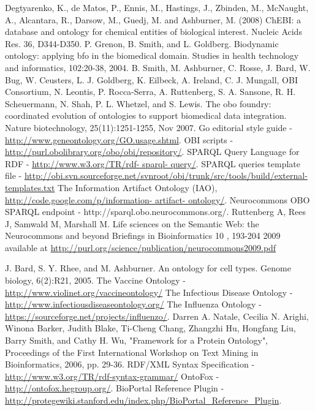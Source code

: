 \documentclass{ao2e}%
\begin{document}
\begin{thebibliography}{}
 Degtyarenko, K., de Matos, P., Ennis, M., Hastings, J., Zbinden, M., McNaught, A., Alcantara, R., Darsow, M., Guedj, M. and Ashburner, M. (2008) ChEBI: a database and ontology for chemical entities of biological interest. Nucleic Acids Res. 36, D344-D350.
 P. Grenon, B. Smith, and L. Goldberg. Biodynamic ontology: applying bfo in the biomedical domain. Studies in health 
technology and informatics, 102:20-38, 2004. 
 B. Smith, M. Ashburner, C. Rosse, J. Bard, W. Bug, W. Ceusters, L. J. Goldberg, K. Eilbeck, A. Ireland, C. J. Mungall, 
OBI Consortium, N. Leontis, P. Rocca-Serra, A. Ruttenberg, S. A. Sansone, R. H. Scheuermann, N. Shah, P. L. Whetzel, and S. Lewis. The obo foundry: coordinated evolution of ontologies to support biomedical data integration. Nature 
biotechnology, 25(11):1251-1255, Nov 2007. 
 Go editorial style guide - \url{http://www.geneontology.org/GO.usage.shtml}.
 OBI scripts -  \url{http://purl.obolibrary.org/obo/obi/repository/}.
 SPARQL Query Language for RDF - \url{http://www.w3.org/TR/rdf- sparql- query/}. 
 SPARQL queries template file - \url{http://obi.svn.sourceforge.net/svnroot/obi/trunk/src/tools/build/external-templates.txt}
 The Information Artifact Ontology (IAO), \url{http://code.google.com/p/information- artifact- ontology/}.
 Neurocommons OBO SPARQL endpoint - http://sparql.obo.neurocommons.org/. 
 Ruttenberg A, Rees J, Samwald M, Marshall M. Life sciences on the Semantic Web: the Neurocommons and beyond Briefings in Bioinformatics 10 , 193-204 2009 available at \url{http://purl.org/science/publication/neurocommons2009.pdf}

 J. Bard, S. Y. Rhee, and M. Ashburner. An ontology for cell types. Genome biology, 6(2):R21, 2005. 
 The Vaccine Ontology - \url{http://www.violinet.org/vaccineontology/}
 The Infectious Disease Ontology - \url{http://www.infectiousdiseaseontology.org/}
 The Influenza Ontology - \url{https://sourceforge.net/projects/influenzo/}.
 Darren A. Natale, Cecilia N. Arighi, Winona Barker, Judith Blake, Ti-Cheng Chang, Zhangzhi Hu, Hongfang Liu, Barry Smith, and Cathy H. Wu, "Framework for a Protein Ontology", Proceedings of the First International Workshop on Text Mining in Bioinformatics, 2006, pp. 29-36.
 RDF/XML Syntax Specification - \url{http://www.w3.org/TR/rdf-syntax-grammar/}
 OntoFox - \url{http://ontofox.hegroup.org/}.
 BioPortal Reference Plugin - \url{http://protegewiki.stanford.edu/index.php/BioPortal_Reference_Plugin}.

 
\end{thebibliography}
    
\end{document}
